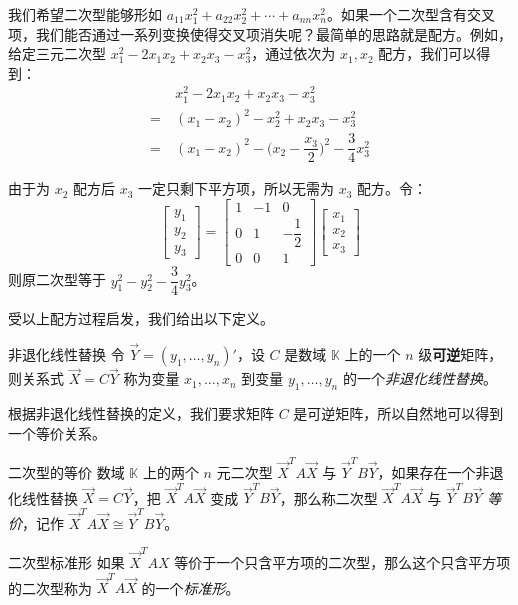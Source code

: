 我们希望二次型能够形如 $a_{11} x_1^2 + a_{22} x_2^2 + \cdots + a_{nn} x_n^2$。如果一个二次型含有交叉项，我们能否通过一系列变换使得交叉项消失呢？最简单的思路就是配方。例如，给定三元二次型 $x_1^2 - 2x_1 x_2 + x_2 x_3 - x_3^2$，通过依次为 $x_1, x_2$ 配方，我们可以得到：
$$
\begin{aligned}&
	x_1^2 - 2x_1 x_2 + x_2 x_3 - x_3^2
	\\=~&
	(x_1 - x_2)^2 - x_2^2 + x_2x_3 - x_3^2
	\\=~&
	(x_1 - x_2)^2 - \biggl( x_2 - \dfrac{x_3}{2} \biggr)^2 - \dfrac{3}{4} x_3^2
\end{aligned}
$$

由于为 $x_2$ 配方后 $x_3$ 一定只剩下平方项，所以无需为 $x_3$ 配方。令：
$$
\begin{bmatrix} y_1 \\ y_2 \\ y_3 \end{bmatrix}
=
\begin{bmatrix}
	1 & -1 & 0
	\\
	0 & 1 & -\dfrac{1}{2}
	\\
	0 & 0 & 1
\end{bmatrix}
\begin{bmatrix} x_1 \\ x_2 \\ x_3 \end{bmatrix}
$$
则原二次型等于 $y_1^2 - y_2^2 - \dfrac{3}{4} y_3^2$。

受以上配方过程启发，我们给出以下定义。

\begin{definition}{非退化线性替换}
	令 $\vec Y = (y_1, \ldots, y_n)'$，设 $C$ 是数域 $\mathbb K$ 上的一个 $n$ 级\textbf{可逆}矩阵，则关系式 $\vec X = C \vec Y$ 称为变量 $x_1, \ldots, x_n$ 到变量 $y_1, \ldots, y_n$ 的一个\emph{非退化线性替换}。
\end{definition}

根据非退化线性替换的定义，我们要求矩阵 $C$ 是可逆矩阵，所以自然地可以得到一个等价关系。

\begin{definition}{二次型的等价}
	数域 $\mathbb K$ 上的两个 $n$ 元二次型 $\vec X^T A \vec X$ 与 $\vec Y^T B \vec Y$，如果存在一个非退化线性替换 $\vec X = C \vec Y$，把 $\vec X^T A \vec X$ 变成 $\vec Y^T B \vec Y$，那么称二次型 $\vec X^T A \vec X$ 与 $\vec Y^T B \vec Y$ \emph{等价}，记作 $\vec X^T A \vec X \cong \vec Y^T B \vec Y$。
\end{definition}

\begin{definition}{二次型标准形}
	如果 $\vec X^T A X$ 等价于一个只含平方项的二次型，那么这个只含平方项的二次型称为 $\vec X^T A \vec X$ 的一个\emph{标准形}。
\end{definition}

